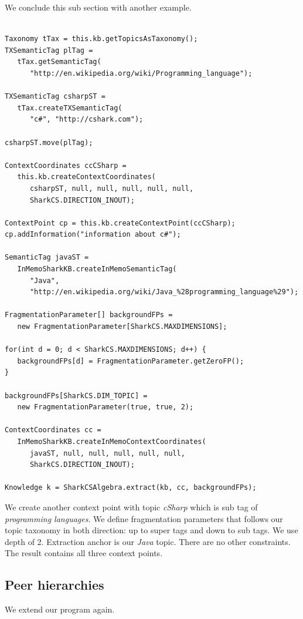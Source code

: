 We conclude this sub section with another example.
\begin{verbatim}

Taxonomy tTax = this.kb.getTopicsAsTaxonomy();
TXSemanticTag plTag = 
   tTax.getSemanticTag(
      "http://en.wikipedia.org/wiki/Programming_language");

TXSemanticTag csharpST = 
   tTax.createTXSemanticTag(
      "c#", "http://cshark.com");

csharpST.move(plTag);

ContextCoordinates ccCSharp = 
   this.kb.createContextCoordinates(
      csharpST, null, null, null, null, null, 
      SharkCS.DIRECTION_INOUT);

ContextPoint cp = this.kb.createContextPoint(ccCSharp);
cp.addInformation("information about c#");

SemanticTag javaST = 
   InMemoSharkKB.createInMemoSemanticTag(
      "Java", 
      "http://en.wikipedia.org/wiki/Java_%28programming_language%29");

FragmentationParameter[] backgroundFPs = 
   new FragmentationParameter[SharkCS.MAXDIMENSIONS];

for(int d = 0; d < SharkCS.MAXDIMENSIONS; d++) {
   backgroundFPs[d] = FragmentationParameter.getZeroFP();
}

backgroundFPs[SharkCS.DIM_TOPIC] = 
   new FragmentationParameter(true, true, 2);

ContextCoordinates cc = 
   InMemoSharkKB.createInMemoContextCoordinates(
      javaST, null, null, null, null, null, 
      SharkCS.DIRECTION_INOUT);

Knowledge k = SharkCSAlgebra.extract(kb, cc, backgroundFPs);
\end{verbatim}

We create another context point with topic {\it cSharp} which is sub tag of {\it programming languages}. We define fragmentation parameters that follows our topic taxonomy in both direction: up to super tags and down to sub tags. We use depth of 2. Extraction anchor is our {\it Java} topic. There are no other constraints. The result contains all three context points.

\subsection{Peer hierarchies}
We extend our program again.

